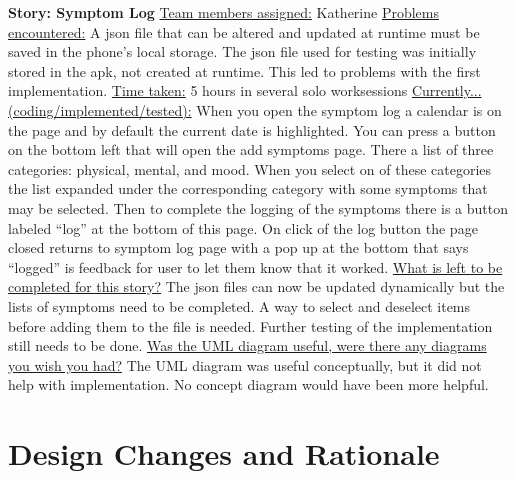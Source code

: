 \documentclass[letterpaper,12pt,titlepage]{article}
\begin{document}
\noindent
\textbf{Story: Symptom Log}
\newline
\newline
\underline{Team members assigned:}
Katherine
\newline
\underline{Problems encountered:}
A json file that can be altered and updated at runtime must be saved in the phone’s local storage. The json file used for testing was initially stored in the apk, not created at runtime. This led to problems with the first implementation.
\newline
\underline{Time taken:}
5 hours in several solo worksessions
\newline
\underline{Currently...(coding/implemented/tested):}
When you open the symptom log a calendar is on the page and by default the current date is highlighted. You can press a button on the bottom left that will open the add symptoms page. There a list of three categories: physical, mental, and mood. When you select on of these categories the list expanded under the corresponding category with some symptoms that may be selected. Then to complete the logging of the symptoms there is a button labeled “log” at the bottom of this page. On click of the log button the page closed returns to symptom log page with a pop up at the bottom that says “logged”  is feedback for user to let them know that it worked.
\newline
\underline{What is left to be completed for this story?}
The json files can now be updated dynamically but the lists of symptoms need to be completed. A way to select and deselect items before adding them to the file is needed. Further testing of the implementation still needs to be done.
\newline
\underline{Was the UML diagram useful, were there any diagrams you wish you had?}
The UML diagram was useful conceptually, but it did not help with implementation. No concept diagram would have been more helpful.
\newline
\newline

\newpage
\section{Design Changes and Rationale}
\end{document}
